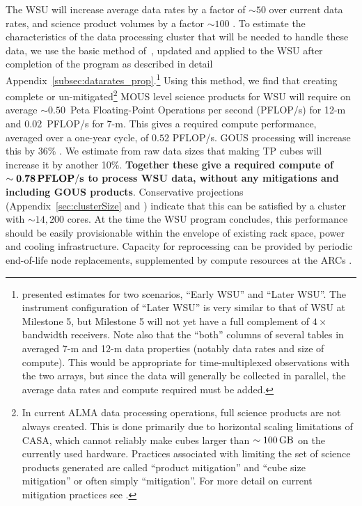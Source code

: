 
The WSU will increase average data rates by a factor of $\sim 50$ over current data rates, and  science product volumes by a factor 
$\sim 100$ \cite{drru_mean}. To estimate the characteristics of the data processing cluster that will be needed to handle these data, we use the basic method of~\cite{dpSizeOfCompute}, updated and applied to the WSU after completion of the program as described in detail Appendix~\ref{subsec:datarates_prop}.\footnote{
\cite{dpSizeOfCompute} presented estimates for two scenarios, ``Early WSU'' and ``Later WSU''. The instrument configuration of ``Later WSU'' is very similar to that of WSU at Milestone 5, but Milestone 5 will not yet have a full complement of $4\times$ bandwidth receivers. Note also that the ``both'' columns of several tables in \cite{dpSizeOfCompute} averaged 7-m and 12-m data properties (notably data rates and size of compute). This would be appropriate for time-multiplexed observations with the two arrays, but since the data will generally be collected in parallel, the average data rates and compute required must be added.
}
Using this method, we find that creating complete or un-mitigated\footnote{
In current ALMA data processing operations, full science products are not always created. This is done primarily due to horizontal scaling limitations of \ac{CASA}, which cannot reliably make cubes larger than $\sim 100 \, {\rm GB}$ on the currently used hardware. Practices associated with limiting the set of science products generated are called ``product mitigation'' and ``cube size mitigation'' or often simply ``mitigation''. For more detail on current mitigation practices see \cite{ALMApipelineHeuristics}.} 
MOUS level science products for WSU will require on average $\sim 0.50$~Peta Floating-Point Operations per second (PFLOP/s) for 12-m and $0.02$~PFLOP/s  for 7-m. This gives a required compute performance, averaged over a one-year cycle, of $0.52$ PFLOP/s. GOUS processing will increase this by 36\%  \cite{computeCostTsi}. We estimate from raw data sizes that  making TP cubes will increase it by another 10\%. 
{\bf Together these give a required compute of} $\mathbf{\sim 0.78} \, {\rm \mathbf{PFLOP/s}}$ {\bf to process WSU data, without any mitigations and including GOUS products}.  
Conservative projections (Appendix~\ref{sec:clusterSize} and \cite{computeCostTsi}) indicate that this can be satisfied by a cluster with $\sim 14,200$ cores.
At the time the WSU program concludes, this performance should be easily provisionable within the envelope of existing rack space, power and cooling infrastructure. Capacity for reprocessing can be provided by periodic end-of-life node replacements, supplemented by compute resources at the ARCs \cite{computeCostTsi}.

